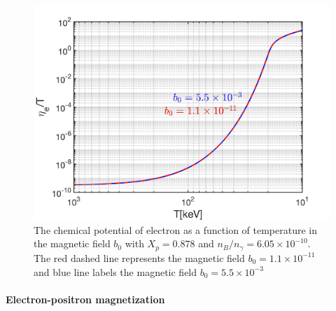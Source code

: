 \begin{figure}[ht]
\begin{center}
\includegraphics[width=\linewidth]{./plots/ChemicalPotential_new_survey}
\caption{The chemical potential of electron as a function of temperature in the magnetic field $b_0$ with $X_p=0.878$ and $n_B/n_\gamma=6.05\times10^{-10}$. The red dashed line represents the magnetic field $b_0=1.1\times10^{-11}$ and blue line labels the magnetic field $b_0=5.5\times10^{-3}$}
\label{ChemicalPotential_B}
\end{center}
\end{figure}

\paragraph{Electron-positron magnetization}

